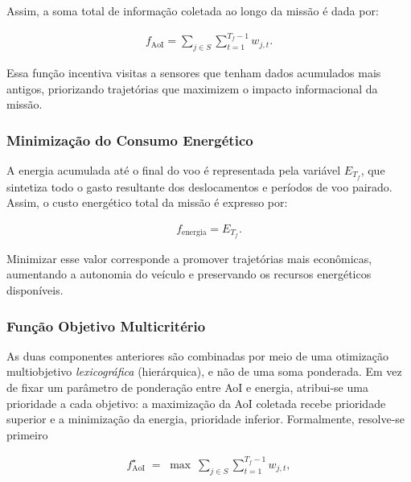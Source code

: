 \documentclass[
    12pt,
    oneside,
    a4paper,
    brazil
]{abntex2}
\begin{document}
    Assim, a soma total de informação coletada ao longo da missão é dada por:
    
    \begin{align}
        f_{\text{AoI}}
        =
        \sum_{j \in S}
        \sum_{t = 1}^{T_f - 1}
        w_{j,t}.
        \label{eq:f-aoi}
    \end{align}
    
    Essa função incentiva visitas a sensores que tenham dados acumulados mais antigos, priorizando trajetórias que maximizem o impacto informacional da missão.
    
    \subsubsection{Minimização do Consumo Energético}
    
    A energia acumulada até o final do voo é representada pela variável $E_{T_f}$, que sintetiza todo o gasto resultante dos deslocamentos e períodos de voo pairado. Assim, o custo energético total da missão é expresso por:
    
    \begin{align}
        f_{\text{energia}}
        =
        E_{T_f}.
        \label{eq:f-energia}
    \end{align}
    
    Minimizar esse valor corresponde a promover trajetórias mais econômicas, aumentando a autonomia do veículo e preservando os recursos energéticos disponíveis.
    
    \subsubsection{Função Objetivo Multicritério}

    As duas componentes anteriores são combinadas por meio de uma otimização multiobjetivo \emph{lexicográfica} (hierárquica), e não de uma soma ponderada. Em vez de fixar um parâmetro de ponderação entre AoI e energia, atribui-se uma prioridade a cada objetivo: a maximização da AoI coletada recebe prioridade superior e a minimização da energia, prioridade inferior. Formalmente, resolve-se primeiro

    \begin{align}
        f_{\text{AoI}}^{\star}
        \;=\;
        \max\
        \sum_{j \in S}
        \sum_{t = 1}^{T_f - 1}
            w_{j,t},
        \label{eq:objetivo-aoi}
    \end{align}
\end{document}
